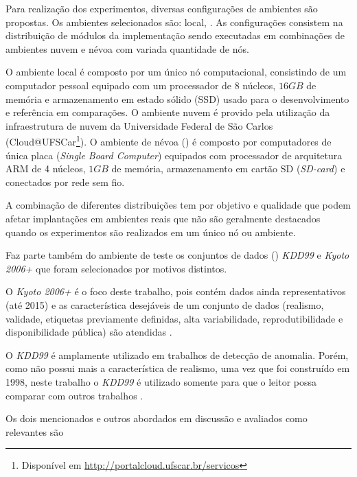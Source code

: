 Para realização dos experimentos, diversas configurações de ambientes são
propostas.
Os ambientes selecionados são: local, 
.
As configurações consistem na distribuição de módulos da implementação \mfog
sendo executadas em combinações de ambientes nuvem e névoa com variada
quantidade de nós.

O ambiente local é composto por um único nó computacional, consistindo de um
computador pessoal equipado com um processador de 8 núcleos, $16GB$ de memória e
armazenamento em estado sólido (SSD) usado para o desenvolvimento e referência
em comparações.
O ambiente nuvem é provido pela utilização da infraestrutura de nuvem da
Universidade Federal de São Carlos (Cloud{@}UFSCar\footnote{Disponível em
\url{http://portalcloud.ufscar.br/servicos}}).
O ambiente de névoa (\fog) é composto por computadores de única placa
(\emph{Single Board Computer}) equipados com processador de arquitetura ARM de 4
núcleos, $1GB$ de memória, armazenamento em cartão SD (\emph{SD-card}) e
conectados por rede sem fio.

A combinação de diferentes distribuições tem por objetivo  e qualidade que podem afetar implantações em ambientes reais que não
são geralmente destacados quando os experimentos são realizados em um único
nó ou ambiente.

Faz parte também do ambiente de teste os conjuntos de dados (\datasets)
\emph{KDD99}
e \emph{Kyoto 2006+}
que foram selecionados por motivos distintos.

O \dataset \emph{Kyoto 2006+} é o foco deste trabalho, pois contém dados ainda
representativos (até 2015) e as característica desejáveis de um conjunto de
dados (realismo, validade, etiquetas previamente definidas, alta variabilidade,
reprodutibilidade e disponibilidade pública) são atendidas
\cite{KyotoDataset,Song2011kyoto}.

O \dataset \emph{KDD99} é amplamente utilizado em trabalhos de detecção de
anomalia.
Porém, como não possui mais a característica de realismo, uma vez que foi
construído em 1998, neste trabalho o \dataset \emph{KDD99} é utilizado somente
para que o leitor possa comparar com outros trabalhos
\cite{Tavallaee2009,Protic2018KddKyoto}.

Os dois \datasets mencionados e outros abordados em discussão e avaliados como
relevantes são

